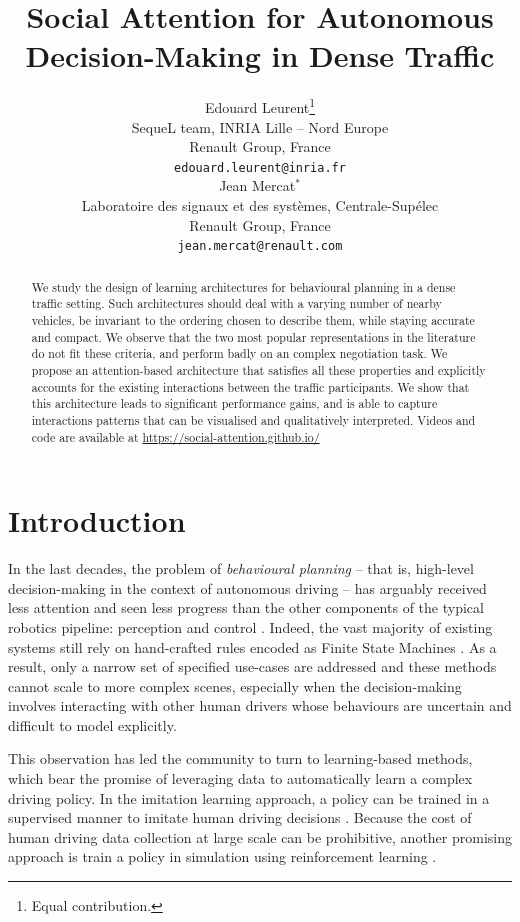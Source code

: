 \documentclass{article}
\title{Social Attention for Autonomous Decision-Making in Dense Traffic}
\author{%
  Edouard Leurent\thanks{Equal contribution.} \\
  SequeL team, INRIA Lille -- Nord Europe\\
  Renault Group, France\\
  \texttt{edouard.leurent@inria.fr} \\
   \And
  Jean Mercat$^*$ \\
  Laboratoire des signaux et des syst\`emes, Centrale-Sup\'elec\\
  Renault Group, France\\
  \texttt{jean.mercat@renault.com} \\
}
\begin{document}
	
	
	

\maketitle

\begin{abstract}
  We study the design of learning architectures for behavioural planning in a dense traffic setting. Such architectures should deal with a varying number of nearby vehicles, be invariant to the ordering chosen to describe them, while staying accurate and compact. We observe that the two most popular representations in the literature do not fit these criteria, and perform badly on an complex negotiation task. We propose an attention-based architecture that satisfies all these properties and explicitly accounts for the existing interactions between the traffic participants. We show that this architecture leads to significant performance gains, and is able to capture interactions patterns that can be visualised and qualitatively interpreted. Videos and code are available at \url{https://social-attention.github.io/}
\end{abstract}

\section{Introduction}

In the last decades, the problem of \emph{behavioural planning} -- that is, high-level decision-making in the context of autonomous driving -- has arguably received less attention and seen less progress than the other components of the typical robotics pipeline: perception and control \citep{Gonzalez2016}. Indeed, the vast majority of existing systems still rely on hand-crafted rules encoded as Finite State Machines \citep{Paden2016}. As a result, only a narrow set of specified use-cases are addressed and these methods cannot scale to more complex scenes, especially when the decision-making involves interacting with other human drivers whose behaviours are uncertain and difficult to model explicitly.

This observation has led the community to turn to learning-based methods, which bear the promise of leveraging data to automatically learn a complex driving policy. In the imitation learning approach, a policy can be trained in a supervised manner to imitate human driving decisions \citep[e.g.][]{Pomerleau1989, Ross2011, Bojarski2016, Xu2016, Eraqi2017, Codevilla2017, Rehder2017c, Rezagholiradeh2018, Rhinehart2018, Bansal2018, Rhinehart2019}. Because the cost of human driving data collection at large scale can be prohibitive, another promising approach is train a policy in simulation using reinforcement learning \citep[e.g.][]{Cardamone2009, Ross2011, Mukadam2017, Chen2017, Isele2018, Ha2018, Kendall2019}.
\end{document}
